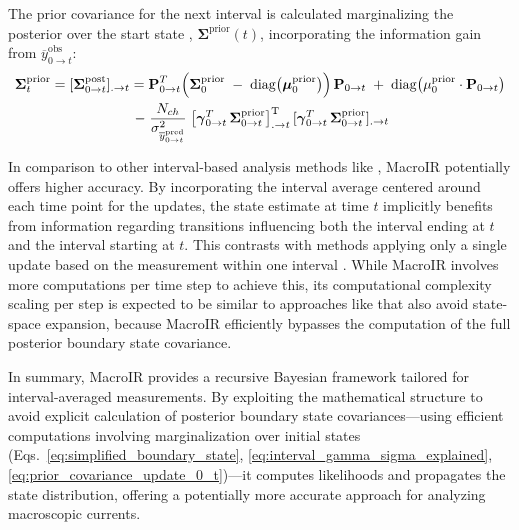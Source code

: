 \documentclass[pdflatex,sn-nature]{sn-jnl}%
\begin{document}
The prior covariance for the next interval is calculated marginalizing the posterior over the start state , \( \boldsymbol{\Sigma}^{\text{prior}}(t) \), incorporating the information gain from \( \overline{y}^{\text{obs}}_{0 \rightarrow t} \):
\begin{multline}
\boldsymbol{\Sigma}_{t}^{\text{prior}}
=[\boldsymbol{\Sigma}_{0 \rightarrow t}^{\text{post}}]_{.\rightarrow t}
 =
\textbf{P}_{0 \rightarrow t}^{T}
\Bigl(
    \boldsymbol{\Sigma}_{0}^{\text{prior}}
    \;-\; 
    \mathrm{diag}\bigl(\boldsymbol\mu_{0}^{\text{prior}}\bigr)
\Bigr)
\,\textbf{P}_{0 \rightarrow t}
\;+\;
\mathrm{diag}\bigl(\mu_{0}^{\text{prior}} \cdot \textbf{P}_{0 \rightarrow t}\bigr)\\
\;-\;
\frac{N_{ch}}{\sigma_{\overline{y}_{0\rightarrow t}^{\text{pred}}}^2}\;
\bigl[\boldsymbol{\gamma}_{0 \rightarrow t}^{T}\,\boldsymbol{\Sigma}_{0\rightarrow t}^{\text{prior}}\bigr]_{. \rightarrow t}^{\text{T}} \,
[\boldsymbol{\gamma}_{0 \rightarrow t}^{T}\,\boldsymbol{\Sigma}_{0\rightarrow t}^{\text{prior}}]_{. \rightarrow t}
\label{eq:prior_cov_next_interval}
\end{multline}

In comparison to other interval-based analysis methods like \cite{Munch2022}, MacroIR potentially offers higher accuracy. By incorporating the interval average centered around each time point for the updates, the state estimate at time \(t\) implicitly benefits from information regarding transitions influencing both the interval ending at \(t\) and the interval starting at \(t\). This contrasts with methods applying only a single update based on the measurement within one interval \cite{Munch2022}. While MacroIR involves more computations per time step to achieve this, its computational complexity scaling per step is expected to be similar to approaches like \cite{Munch2022} that also avoid state-space expansion, because MacroIR efficiently bypasses the computation of the full posterior boundary state covariance.

In summary, MacroIR provides a recursive Bayesian framework tailored for interval-averaged measurements. By exploiting the mathematical structure to avoid explicit calculation of posterior boundary state covariances—using efficient computations involving marginalization over initial states (Eqs.~\ref{eq:simplified_boundary_state}, \ref{eq:interval_gamma_sigma_explained}, \ref{eq:prior_covariance_update_0_t})—it computes likelihoods and propagates the state distribution, offering a potentially more accurate approach for analyzing macroscopic currents.
\end{document}
